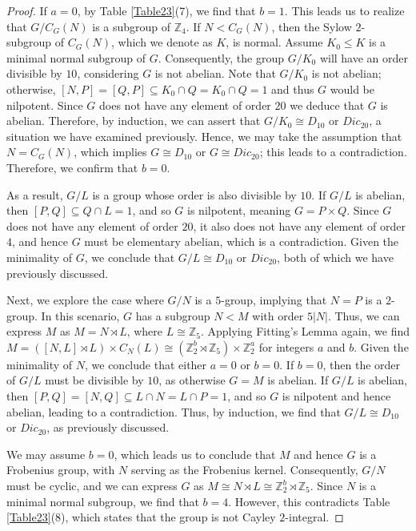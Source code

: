 \documentclass{amsart}
\def \leq {\leqslant}
\begin{document}
\begin{proof}
If \(a = 0\), by Table \ref{Table23}(7), we find that \(b = 1\). This leads us to realize that \(G/C_G(N)\) is a subgroup of \(\mathbb{Z}_4\). If \(N < C_G(N)\), then the Sylow \(2\)-subgroup of \(C_G(N)\), which we denote as \(K\), is normal. Assume \(K_0 \leq K\) is a minimal normal subgroup of \(G\). Consequently, the group \(G/K_0\) will have an order divisible by \(10\), considering \(G\) is not abelian. Note that \(G/K_0\) is not abelian; otherwise, \([N, P] = [Q, P] \subseteq K_0 \cap Q = K_0 \cap Q = 1\) and thus \(G\) would be nilpotent. Since $G$ does not have any element of order $20$ we deduce that \(G\) is abelian. Therefore, by induction, we can assert that \(G/K_0 \cong D_{10}\) or \(Dic_{20}\), a situation we have examined previously. Hence, we may take the assumption that \(N = C_G(N)\), which implies \(G \cong D_{10}\) or \(G \cong Dic_{20}\); this leads to a contradiction. Therefore, we confirm that \(b = 0\).

As a result, \(G/L\) is a group whose order is also divisible by \(10\). If \(G/L\) is abelian, then $[P,Q]\subseteq Q\cap L=1$, and so \(G\) is nilpotent, meaning \(G = P \times Q\). Since \(G\) does not have any element of order \(20\), it also does not have any element of order \(4\), and hence \(G\) must be elementary abelian, which is a contradiction. Given the minimality of \(G\), we conclude that \(G/L \cong D_{10}\) or \(Dic_{20}\), both of which we have previously discussed.

Next, we explore the case where \(G/N\) is a \(5\)-group, implying that \(N=P\) is a \(2\)-group. In this scenario, \(G\) has a subgroup \(N < M\) with order \(5|N|\). Thus, we can express \(M\) as \(M = N \rtimes L\), where \(L \cong \mathbb{Z}_5\). Applying Fitting's Lemma again, we find \(M = ([N, L] \rtimes L) \times C_N(L) \cong (\mathbb{Z}_2^b \rtimes \mathbb{Z}_5) \times \mathbb{Z}_2^a\) for integers \(a\) and \(b\). Given the minimality of \(N\), we conclude that either \(a = 0\) or \(b = 0\). If \(b = 0\), then the order of \(G/L\) must be divisible by \(10\), as otherwise \(G=M\) is abelian. If \(G/L\) is abelian, then \([P,Q]=[N, Q]\subseteq L\cap N=L\cap P=1\), and so \(G\) is nilpotent and hence abelian, leading to a contradiction. Thus, by induction, we find that \(G/L \cong D_{10}\) or \(Dic_{20}\), as previously discussed.

We may assume \(b = 0\), which leads us to conclude that \(M\) and hence \(G\) is a Frobenius group, with \(N\) serving as the Frobenius kernel. Consequently, \(G/N\) must be cyclic, and we can express \(G\) as \(M \cong N \rtimes L \cong \mathbb{Z}_2^b \rtimes \mathbb{Z}_5\). Since \(N\) is a minimal normal subgroup, we find that \(b = 4\). However, this contradicts Table \ref{Table23}(8), which states that the group is not Cayley \(2\)-integral.


\end{proof}
\end{document}
